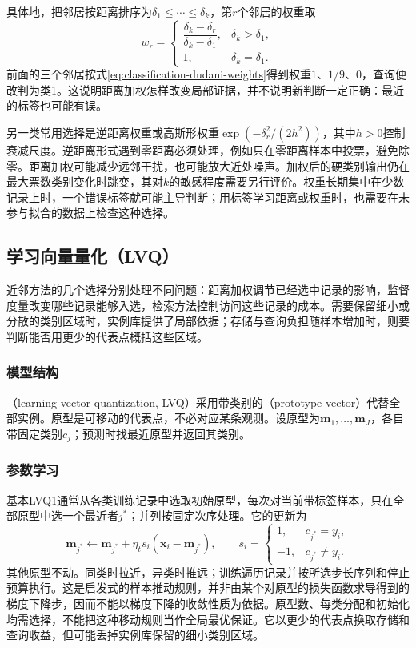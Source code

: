 具体地，把邻居按距离排序为$\delta_1\leq\cdots\leq\delta_k$，第$r$个邻居的权重取
\begin{equation}
  w_r=
  \begin{cases}
    \dfrac{\delta_k-\delta_r}{\delta_k-\delta_1},
      & \delta_k>\delta_1,\\[4pt]
    1, & \delta_k=\delta_1.
  \end{cases}
  \label{eq:classification-dudani-weights}
\end{equation}
前面的三个邻居按式\eqref{eq:classification-dudani-weights}得到权重$1$、$1/9$、$0$，查询便改判为类1。这说明距离加权怎样改变局部证据，并不说明新判断一定正确：最近的标签也可能有误。

另一类常用选择是逆距离权重或高斯形权重$\exp(-\delta_r^2/(2h^2))$，其中$h>0$控制衰减尺度。逆距离形式遇到零距离必须处理，例如只在零距离样本中投票，避免除零。距离加权可能减少远邻干扰，也可能放大近处噪声。加权后的硬类别输出仍在最大票数类别变化时跳变，其对$k$的敏感程度需要另行评价。权重长期集中在少数记录上时，一个错误标签就可能主导判断；用标签学习距离或权重时，也需要在未参与拟合的数据上检查这种选择。

\subsection{学习向量量化（LVQ）}
\label{sec:classification-lvq}

近邻方法的几个选择分别处理不同问题：距离加权调节已经选中记录的影响，监督度量改变哪些记录能够入选，检索方法控制访问这些记录的成本。需要保留细小或分散的类别区域时，实例库提供了局部依据；存储与查询负担随样本增加时，则要判断能否用更少的代表点概括这些区域。

\subsubsection{模型结构}
（learning vector quantization, LVQ）采用带类别的（prototype vector）代替全部实例。原型是可移动的代表点，不必对应某条观测。设原型为$\bm m_1,\ldots,\bm m_J$，各自带固定类别$c_j$；预测时找最近原型并返回其类别。

\subsubsection{参数学习}
基本LVQ1通常从各类训练记录中选取初始原型，每次对当前带标签样本，只在全部原型中选一个最近者$j^\ast$；并列按固定次序处理。它的更新为
\[
  \bm m_{j^\ast}\leftarrow\bm m_{j^\ast}
    +\eta_t s_i(\bm x_i-\bm m_{j^\ast}),\qquad
  s_i=\begin{cases}1,&c_{j^\ast}=y_i,\\-1,&c_{j^\ast}\ne y_i.\end{cases}
\]
其他原型不动。同类时拉近，异类时推远；训练遍历记录并按所选步长序列和停止预算执行。这是启发式的样本推动规则，并非由某个对原型的损失函数求导得到的梯度下降步，因而不能以梯度下降的收敛性质为依据。原型数、每类分配和初始化均需选择，不能把这种移动规则当作全局最优保证。它以更少的代表点换取存储和查询收益，但可能丢掉实例库保留的细小类别区域。

